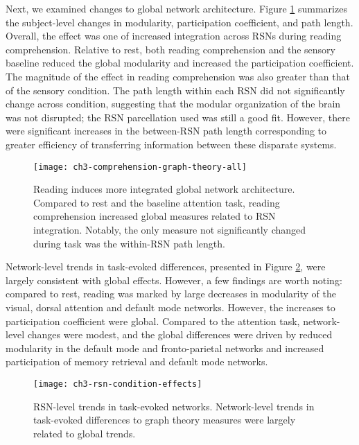 Next, we examined changes to global network architecture. Figure \ref{fig:ch3-comprehension-graph-theory-all} summarizes the subject-level changes in modularity, participation coefficient, and path length. Overall, the effect was one of increased integration across RSNs during reading comprehension. Relative to rest, both reading comprehension and the sensory baseline reduced the global modularity and increased the participation coefficient. The magnitude of the effect in reading comprehension was also greater than that of the sensory condition. The path length within each RSN did not significantly change across condition, suggesting that the modular organization of the brain was not disrupted; the RSN parcellation used was still a good fit. However, there were significant increases in the between-RSN path length corresponding to greater efficiency of transferring information between these disparate systems.

\begin{figure}[t]
	\centering
	\texttt{[image: ch3-comprehension-graph-theory-all]}
    \caption[Reading induces more integrated global network architecture.]{Reading induces more integrated global network architecture. Compared to rest and the baseline attention task, reading comprehension increased global measures related to RSN integration. Notably, the only measure not significantly changed during task was the within-RSN path length.}
	\label{fig:ch3-comprehension-graph-theory-all}
\end{figure}

Network-level trends in task-evoked differences, presented in Figure   \ref{fig:ch3-rsn-condition-effects}, were largely consistent with global effects. However, a few findings are worth noting: compared to rest, reading was marked by large decreases in modularity of the visual, dorsal attention and default mode networks. However, the increases to participation coefficient were global. Compared to the attention task, network-level changes were modest, and the global differences were driven by reduced modularity in the default mode and fronto-parietal networks and increased participation of memory retrieval and default mode networks.

\begin{figure}[t]
	\centering
	\texttt{[image: ch3-rsn-condition-effects]}
    \caption[RSN-level trends in task-evoked networks.]{RSN-level trends in task-evoked networks. Network-level trends in task-evoked differences to graph theory measures were largely related to global trends.}
	\label{fig:ch3-rsn-condition-effects}
\end{figure}


